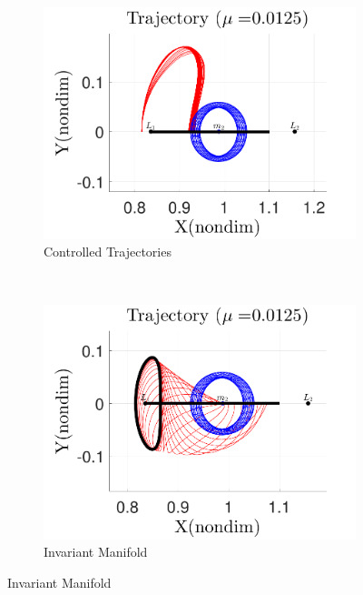 \documentclass[preprint]{elsarticle}
\begin{document}
\begin{figure} 
	\centering 
	\begin{subfigure}[htbp]{0.5\textwidth} 
		\includegraphics[width=\textwidth]{reach_trajectory} 
		\caption{Controlled Trajectories} \label{fig:reach_trajectory} 
	\end{subfigure}~ %
	\begin{subfigure}[htbp]{0.5\textwidth} 
		\includegraphics[width=\textwidth]{manifold_trajectory} 
		\caption{Invariant Manifold} \label{fig:manifold_trajectory} 
	\end{subfigure} 
	

\end{figure}
\end{document}
